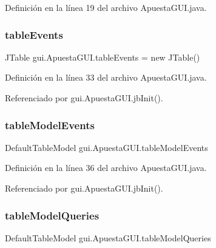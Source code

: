 Definición en la línea 19 del archivo Apuesta\+G\+U\+I.\+java.

\mbox{\label{classgui_1_1ApuestaGUI_ad1013620386b69c40a3de1b026eaeda1}} 
\subsubsection{\texorpdfstring{tableEvents}{tableEvents}}
{\footnotesize\ttfamily J\+Table gui.\+Apuesta\+G\+U\+I.\+table\+Events = new J\+Table()\hspace{0.3cm}{\ttfamily [private]}}



Definición en la línea 33 del archivo Apuesta\+G\+U\+I.\+java.



Referenciado por gui.\+Apuesta\+G\+U\+I.\+jb\+Init().

\mbox{\label{classgui_1_1ApuestaGUI_a97a1e997e9b5188b4afa3f26a1a92847}} 
\subsubsection{\texorpdfstring{tableModelEvents}{tableModelEvents}}
{\footnotesize\ttfamily Default\+Table\+Model gui.\+Apuesta\+G\+U\+I.\+table\+Model\+Events\hspace{0.3cm}{\ttfamily [private]}}



Definición en la línea 36 del archivo Apuesta\+G\+U\+I.\+java.



Referenciado por gui.\+Apuesta\+G\+U\+I.\+jb\+Init().

\mbox{\label{classgui_1_1ApuestaGUI_afaf67870f0f157f4f406c278553d5fa5}} 
\subsubsection{\texorpdfstring{tableModelQueries}{tableModelQueries}}
{\footnotesize\ttfamily Default\+Table\+Model gui.\+Apuesta\+G\+U\+I.\+table\+Model\+Queries\hspace{0.3cm}{\ttfamily [private]}}



